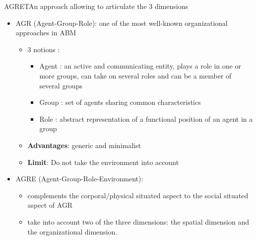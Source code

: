 \begin{frame}{AGRET}{An approach allowing to articulate the 3 dimensions}
\begin{itemize}
    \item AGR (Agent-Group-Role): one of the most well-known organizational approaches in ABM
    \begin{itemize}
        \item 3 notions :
            \begin{itemize}
                \item Agent : an active and communicating entity, plays a role in one or more groups, can take on several roles and can be a member of several groups
                \item Group :  set of agents sharing common characteristics
                \item Role : abstract representation of a functional position of an agent in a group
            \end{itemize}
        \item \textbf{Advantages}: generic and minimalist
        \item \textbf{Limit}: Do not take the environment into account
    \end{itemize}
    \item AGRE (Agent-Group-Role-Environment):  
    \begin{itemize}
        \item  complements the corporal/physical situated aspect to the social situated aspect of AGR
        \item take into account two of the three dimensions: the spatial dimension and the organizational dimension.
    \end{itemize}
\end{itemize}


\end{frame}
